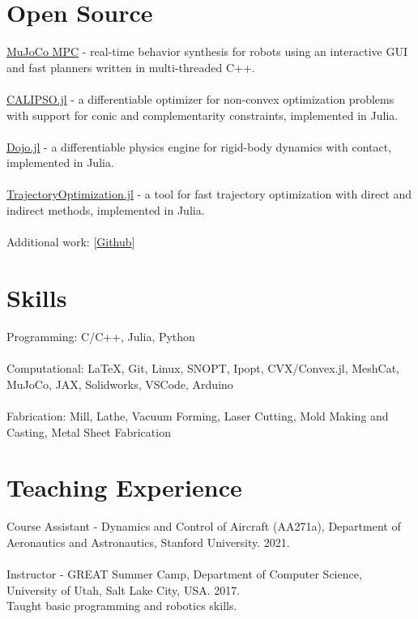 \documentclass[10pt]{article}
\begin{document}
\section*{Open Source}
\href{https://github.com/deepmind/mujoco_mpc}{MuJoCo MPC} - real-time behavior synthesis for robots using an interactive GUI and fast planners written in multi-threaded C++.
\\
\\
\href{https://github.com/thowell/CALIPSO.jl}{CALIPSO.jl} - a differentiable optimizer for non-convex optimization problems with support for conic and complementarity constraints, implemented in Julia.
\\
\\
\href{https://github.com/dojo-sim/Dojo.jl}{Dojo.jl} - a differentiable physics engine for rigid-body dynamics with contact, implemented in Julia.
\\
\\
\href{https://github.com/RoboticExplorationLab/TrajectoryOptimization.jl}{TrajectoryOptimization.jl} - a tool for fast trajectory optimization with direct and indirect methods, implemented in Julia.
\\
\\
Additional work: [\href{https://github.com/thowell}{Github}]

\section*{Skills}
Programming: C/C++, Julia, Python
\\
\\
Computational: \LaTeX, Git, Linux, SNOPT, Ipopt, CVX/Convex.jl, MeshCat, MuJoCo, JAX, Solidworks, VSCode, Arduino
\\
\\
Fabrication: Mill, Lathe, Vacuum Forming, Laser Cutting, Mold Making and Casting, Metal Sheet Fabrication

\section*{Teaching Experience}
Course Assistant - Dynamics and Control of Aircraft (AA271a), Department of Aeronautics and Astronautics, Stanford University. 2021.
\\
\\
Instructor - GREAT Summer Camp, Department of Computer Science, University of Utah, Salt Lake City, USA. 2017. \\
Taught basic programming and robotics skills.
\end{document}
